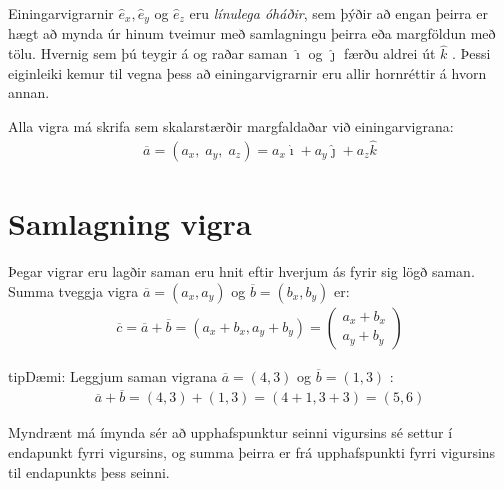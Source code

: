 \documentclass[a4paper,10pt,icelandic]{sphinxmanual}
\begin{document}
Einingarvigrarnir \(\hat{e}_x, \hat{e}_y\) og \(\hat{e}_z\) eru \textit{línulega óháðir}, sem þýðir að engan þeirra er hægt að mynda úr hinum tveimur með samlagningu þeirra eða margföldun með tölu.
Hvernig sem þú teygir á og raðar saman \(\hat{\imath}\) og \(\hat{\jmath}\) færðu aldrei út \(\hat{k}\) .
Þessi eiginleiki kemur til vegna þess að einingarvigrarnir eru allir hornréttir á hvorn annan.

Alla vigra má skrifa sem skalarstærðir margfaldaðar við einingarvigrana:
\begin{equation*}
\begin{split}\overline{a} = (a_x, \; a_y, \; a_z ) = a_x \hat{\imath} + a_y \hat{\jmath} + a_z \hat{k}\end{split}
\end{equation*}

\section{Samlagning vigra}
\label{\detokenize{Kafli08:samlagning-vigra}}
Þegar vigrar eru lagðir saman eru hnit eftir hverjum ás fyrir sig lögð saman.
Summa tveggja vigra \(\overline{a} = (a_x,a_y)\) og \(\overline{b} = (b_x,b_y)\) er:
\begin{equation*}
\begin{split}\overline{c} = \overline{a} + \overline{b} = (a_x + b_x, a_y +b_y) = \begin{pmatrix} a_x+b_x \\ a_y+b_y \end{pmatrix}\end{split}
\end{equation*}
\begin{sphinxadmonition}{tip}{Dæmi:}
Leggjum saman vigrana \(\overline{a}=(4,3)\) og \(\overline{b}=(1,3)\) :
\begin{equation*}
\begin{split}\overline{a}+\overline{b}=(4,3) + (1,3) = (4+1, 3+3) = (5,6)\end{split}
\end{equation*}\end{sphinxadmonition}

Myndrænt má ímynda sér að upphafspunktur seinni vigursins sé settur í endapunkt fyrri vigursins,
og summa þeirra er frá upphafspunkti fyrri vigursins til endapunkts þess seinni.

\begin{figure}[htbp]
\centering

\noindent{}
\end{figure}
\end{document}
